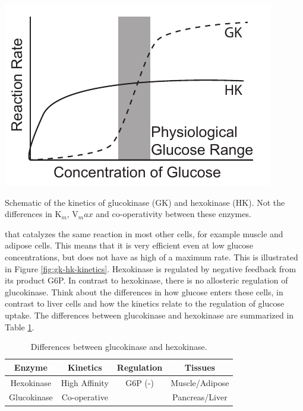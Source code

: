 \documentclass{tufte-handout}
\begin{document}
\begin{marginfigure}
\includegraphics{figures/gk-hk-kinetics.pdf}
\caption{Schematic of the kinetics of glucokinase (GK) and hexokinase (HK).  Not the differences in K$_m$, V$_max$ and co-operativity between these enzymes.}
\label{fig:gk-hk-kinetics}
\end{marginfigure}

 that catalyzes the same reaction in most other cells, for example muscle and adipose cells.  This means that it is very efficient even at low glucose concentrations, but does not have as high of a maximum rate.  This is illustrated in Figure \ref{fig:gk-hk-kinetics}.  Hexokinase is regulated by negative feedback from its product G6P.  In contrast to hexokinase, there is no allosteric regulation of glucokinase.  Think about the differences in how glucose enters these cells, in contrast to liver cells and how the kinetics relate to the regulation of glucose uptake.  The differences between glucokinase and hexokinase are summarized in Table \ref{tab:glucokinase}.

\begin{table}
\centering
\caption{Differences between glucokinase and hexokinase.}
\label{tab:glucokinase}
\begin{tabular}{cccc}
\hline
\textbf {Enzyme} & \textbf{Kinetics}  & \textbf{Regulation}  & \textbf{Tissues}\\
\hline
Hexokinase & High Affinity & G6P (-) & Muscle/Adipose\\
Glucokinase & Co-operative & & Pancreas/Liver\\

\hline
\end{tabular}
\end{table}
\end{document}
